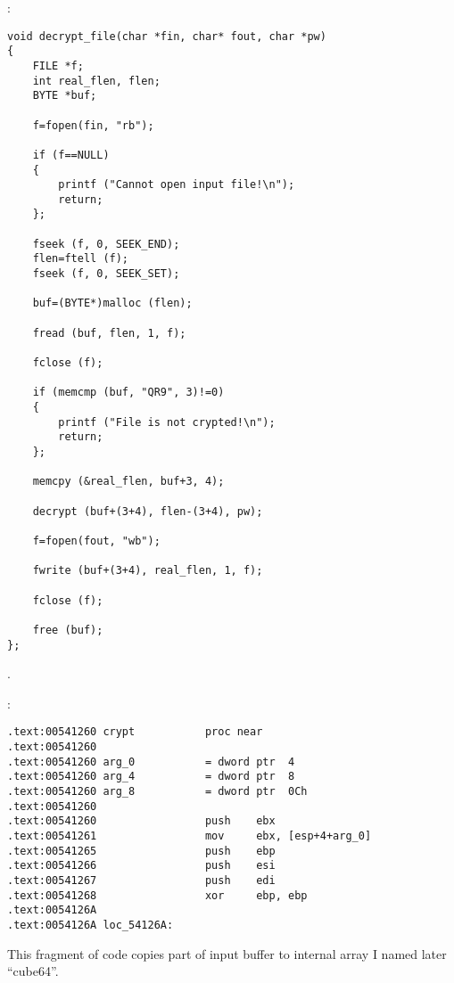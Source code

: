 :

\begin{lstlisting}
void decrypt_file(char *fin, char* fout, char *pw)
{
	FILE *f;
	int real_flen, flen;
	BYTE *buf;

	f=fopen(fin, "rb");
	
	if (f==NULL)
	{
		printf ("Cannot open input file!\n");
		return;
	};

	fseek (f, 0, SEEK_END);
	flen=ftell (f);
	fseek (f, 0, SEEK_SET);

	buf=(BYTE*)malloc (flen);

	fread (buf, flen, 1, f);

	fclose (f);

	if (memcmp (buf, "QR9", 3)!=0)
	{
		printf ("File is not crypted!\n");
		return;
	};

	memcpy (&real_flen, buf+3, 4);

	decrypt (buf+(3+4), flen-(3+4), pw);
	
	f=fopen(fout, "wb");

	fwrite (buf+(3+4), real_flen, 1, f);

	fclose (f);

	free (buf);
};
\end{lstlisting}

.

 :

\begin{lstlisting}
.text:00541260 crypt           proc near
.text:00541260
.text:00541260 arg_0           = dword ptr  4
.text:00541260 arg_4           = dword ptr  8
.text:00541260 arg_8           = dword ptr  0Ch
.text:00541260
.text:00541260                 push    ebx
.text:00541261                 mov     ebx, [esp+4+arg_0]
.text:00541265                 push    ebp
.text:00541266                 push    esi
.text:00541267                 push    edi
.text:00541268                 xor     ebp, ebp
.text:0054126A
.text:0054126A loc_54126A:
\end{lstlisting}

{This fragment of code copies part of input buffer to internal array I named later ``cube64''.}

